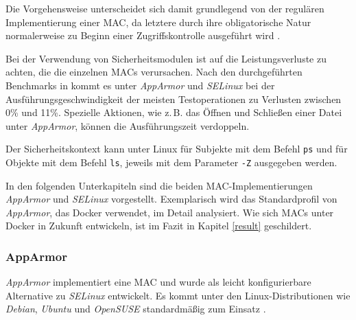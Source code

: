 \documentclass[../main.tex]{subfiles}
\begin{document}
			Die Vorgehensweise unterscheidet sich damit grundlegend von der regulären Implementierung einer MAC, da letztere durch ihre obligatorische Natur normalerweise zu Beginn einer Zugriffskontrolle ausgeführt wird \cite[S.3]{LSMFramework}.


			Bei der Verwendung von Sicherheitsmodulen ist auf die Leistungsverluste zu achten, die die einzelnen MACs verursachen. Nach den durchgeführten Benchmarks in \cite[S.51ff.]{SELinuxApparmor} kommt es unter \emph{AppArmor} und \emph{SELinux} bei der Ausführungsgeschwindigkeit der meisten Testoperationen zu Verlusten zwischen 0\% und 11\%. Spezielle Aktionen, wie z.\,B. das Öffnen und Schließen einer Datei unter \emph{AppArmor}, können die Ausführungszeit verdoppeln.



			Der Sicherheitskontext kann unter Linux für Subjekte mit dem Befehl \texttt{ps} und für Objekte mit dem Befehl \texttt{ls}, jeweils mit dem Parameter \texttt{-Z} ausgegeben werden.








			In den folgenden Unterkapiteln sind die beiden MAC-Implementierungen \emph{AppArmor} und \emph{SELinux} vorgestellt. Exemplarisch wird das Standardprofil von \emph{AppArmor}, das Docker verwendet, im Detail analysiert. Wie sich MACs unter Docker in Zukunft entwickeln, ist im Fazit in Kapitel \ref{result} geschildert.

			\subsubsection{\acrshort{AppArmor}}
			\label{apparmor}
				\emph{AppArmor} implementiert eine MAC und wurde als leicht konfigurierbare Alternative zu \emph{SELinux} entwickelt. Es kommt unter den Linux-Distributionen wie \emph{Debian}, \emph{Ubuntu} und \emph{OpenSUSE} standardmäßig zum Einsatz \cite{apparmorUbuntu}.
\end{document}
